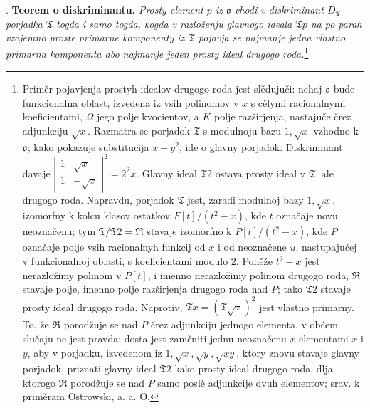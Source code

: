 \documentclass[11pt]{article}
\newcommand{\mo}{\mathfrak{o}}
\newcommand{\mT}{\mathfrak{T}}
\newcommand{\mR}{\mathfrak{R}}
\begin{document}
\setcounter{footnote}{28}

. \textbf{Teorem o diskriminantu.} \emph{Prosty element $p$ iz $\mo$ vhodi v diskriminant $D_\mT$ porjadka $\mT$ togda i samo togda, kogda v razloženju glavnogo ideala $\mT p$ na po parah vzajemno proste primarne komponenty iz $\mT$ pojavja se najmanje jedna vlastno primarna komponenta abo najmanje jeden prosty ideal drugogo roda.}\footnote{Priměr pojavjenja prostyh idealov drugogo roda jest slědujuči: nehaj $\mo$ bude funkcionalna oblast, izvedena iz vsih polinomov v $x$ s cělymi racionalnymi koeficientami, $\Omega$ jego polje kvocientov, a $K$ polje razširjenja, nastajuče črez adjunkciju $\sqrt{x}$. Razmatra se porjadok $\mT$ s modulnoju bazu $1,\sqrt{x}$ vzhodno k $\mo$; kako pokazuje substitucija $x-y^2$, ide o glavny porjadok. Diskriminant davaje $\left|\begin{smallmatrix}1&\sqrt{x}\\1&-\sqrt{x}\end{smallmatrix}\right|^2=2^2x$. Glavny ideal $\mT2$ ostava prosty ideal v $\mT$, ale drugogo roda. Napravdu, porjadok $\mT$ jest, zaradi modulnoj bazy $1,\sqrt{x}$, izomorfny k kolcu klasov ostatkov $F[t]/(t^2-x)$, kde $t$ označaje novu neoznačenu; tym $\mT/\mT2=\mR$ stavaje izomorfno k $P[t]/(t^2-x)$, kde $P$ označaje polje vsih racionalnyh funkcij od $x$ i od neoznačene $u$, nastupajučej v funkcionalnoj oblasti, s koeficientami modulo $2$. Poněže $t^2-x$ jest nerazložimy polinom v $P[t]$, i imenno nerazložimy polinom drugogo roda, $\mR$ stavaje polje, imenno polje razširjenja drugogo roda nad $P$; tako $\mT2$ stavaje prosty ideal drugogo roda. Naprotiv, $\mT x=(\mT\sqrt{x})^2$ jest vlastno primarny. To, že $\mR$ porodžuje se nad $P$ črez adjunkciju jednogo elementa, v obćem slučaju ne jest pravda: dosta jest zaměniti jednu neoznačenu $x$ elementami $x$ i $y$, aby v porjadku, izvedenom iz $1,\sqrt{x},\sqrt{y},\sqrt{xy}$, ktory znovu stavaje glavny porjadok, priznati glavny ideal $\mT2$ kako prosty ideal drugogo roda, dlja ktorogo $\mR$ porodžuje se nad $P$ samo poslě adjunkcije dvuh elementov; srav. k priměram Ostrowski, a. a. O.}
\end{document}
